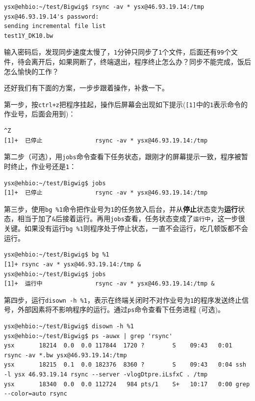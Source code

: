 \documentclass[]{article}
\numberwithin{figure}{section}
\numberwithin{table}{section}
\begin{document}
\begin{verbatim}
ysx@ehbio:~/test/Bigwig$ rsync -av * ysx@46.93.19.14:/tmp
ysx@46.93.19.14's password: 
sending incremental file list
test1Y_DK10.bw
\end{verbatim}

输入密码后，发现同步速度太慢了，\texttt{1}分钟只同步了\texttt{1}个文件，后面还有\texttt{99}个文件，待会离开后，如果网断了，终端退出，程序终止怎么办？同步不能完成，饭后怎么愉快的工作？

还好我们有下面的方案，一步步跟着操作，补救一下。

第一步，按\texttt{ctrl+z}把程序挂起，操作后屏幕会出现如下提示(\texttt{{[}1{]}}中的\texttt{1}表示命令的作业号，后面会用到)：

\begin{verbatim}
^Z
[1]+  已停止               rsync -av * ysx@46.93.19.14:/tmp
\end{verbatim}

第二步（可选），用\texttt{jobs}命令查看下任务状态，跟刚才的屏幕提示一致，程序被暂时终止，作业号还是\texttt{1}：

\begin{verbatim}
ysx@ehbio:~/test/Bigwig$ jobs
[1]+  已停止               rsync -av * ysx@46.93.19.14:/tmp
\end{verbatim}

第三步，使用\texttt{bg\ \%1}命令把作业号为\texttt{1}的任务放入后台，并从\textbf{停止}状态变为\textbf{运行}状态，相当于加了\texttt{\&}后接着运行。再用\texttt{jobs}查看，任务状态变成了\texttt{运行中}，这一步很关键。如果没有运行\texttt{bg\ \%1}则程序处于停止状态，一直不会运行，吃几顿饭都不会运行。

\begin{verbatim}
ysx@ehbio:~/test/Bigwig$ bg %1
[1]+ rsync -av * ysx@46.93.19.14:/tmp &
ysx@ehbio:~/test/Bigwig$ jobs
[1]+  运行中               rsync -av * ysx@46.93.19.14:/tmp &
\end{verbatim}

第四步，运行\texttt{disown\ -h\ \%1}，表示在终端关闭时不对作业号为\texttt{1}的程序发送终止信号，外部因素将不影响程序的运行。通过\texttt{ps}命令查看下任务进程 (可选)。

\begin{verbatim}
ysx@ehbio:~/test/Bigwig$ disown -h %1
ysx@ehbio:~/test/Bigwig$ ps -auwx | grep 'rsync'
ysx       18214  0.0  0.0 117844  1720 ?        S    09:43   0:01 rsync -av *.bw ysx@46.93.19.14:/tmp
ysx       18215  0.1  0.0 182376  8360 ?        S    09:43   0:04 ssh -l ysx 46.93.19.14 rsync --server -vlogDtpre.iLsfxC . /tmp
ysx       18340  0.0  0.0 112724   984 pts/1    S+   10:17   0:00 grep --color=auto rsync
\end{verbatim}
\end{document}
